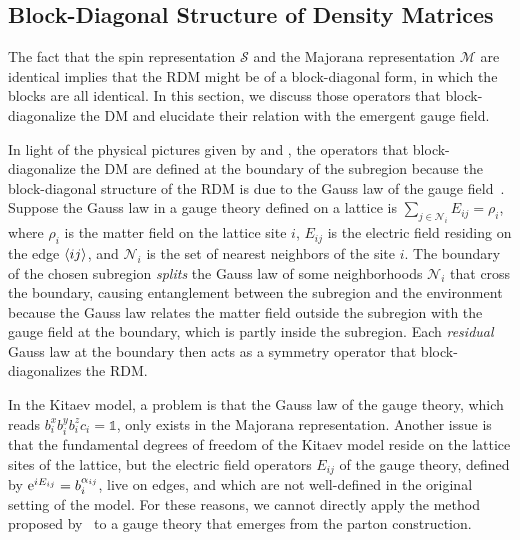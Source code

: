 \subsection{Block-Diagonal Structure of Density Matrices}\label{sec:block-diagonal-structure}

The fact that the spin representation $\mathcal{S}$ and the Majorana representation $\mathcal{M}$ are identical implies that the RDM might be of a block-diagonal form, in which the blocks are all identical. In this section, we discuss those operators that block-diagonalize the DM and elucidate their relation with the emergent gauge field. 

In light of the physical pictures given by \cite{Yao-Qi_2010} and \cite{Xu-Rakovszky-Knap-Pollmann_2025}, the operators that block-diagonalize the DM are defined at the boundary of the subregion because the block-diagonal structure of the RDM is due to the Gauss law of the gauge field~\cite{Xu-Rakovszky-Knap-Pollmann_2025}. Suppose the Gauss law in a gauge theory defined on a lattice is $\sum_{j\in \mathcal{N}_i}E_{ij} = \rho_i$, where $\rho_i$ is the matter field on the lattice site $i$, $E_{ij}$ is the electric field residing on the edge $\left\langle ij \right\rangle$, and $\mathcal{N}_i$ is the set of nearest neighbors of the site $i$. The boundary of the chosen subregion \textit{splits} the Gauss law of some neighborhoods $\mathcal{N}_i$ that cross the boundary, causing entanglement between the subregion and the environment because the Gauss law relates the matter field outside the subregion with the gauge field at the boundary, which is partly inside the subregion. Each \textit{{residual}} Gauss law at the boundary then acts as a symmetry operator that block-diagonalizes the RDM. 

In the Kitaev model, a problem is that the Gauss law of the gauge theory, which reads $b^x_ib^y_ib^z_ic_i = \mathds{1}$, only exists in the Majorana representation. Another issue is that the fundamental degrees of freedom of the Kitaev model reside on the lattice sites of the lattice, but the electric field operators $E_{ij}$ of the gauge theory, defined by $\mathrm{e}^{i E_{ij}} = b^{\alpha_{ij}}_i$, live on edges, and which are not well-defined in the original setting of the model. For these reasons, we cannot directly apply the method proposed by~\cite{Xu-Rakovszky-Knap-Pollmann_2025} to a gauge theory that emerges from the parton construction. 

